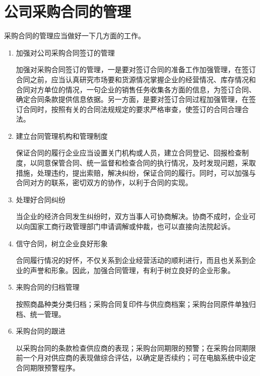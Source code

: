 \section {公司采购合同的管理}

    采购合同的管理应当做好一下几方面的工作。

    \begin{enumerate}
        \item 加强对公司采购合同签订的管理

        加强对采购合同签订的管理，一是要对签订合同的准备工作加强管理，在签订合同之前，应当认真研究市场要和货源情况掌握企业的经营情况、库存情况和合同对方单位的情况，一句企业的销售任务收集各方面的信息，为签订合同、确定合同条款提供信息依据。另一方面，是要对签订合同过程加强管理，在签订合同时，按照有关的合同法规规定的要求严格审查，使签订的合同合理合法。

        \item 建立台同管理机构和管理制度

        保证合同的履行企业应当设置关门机构或人员，建立合同登记、回报检查制度，以同意保管合同、统一监督和检查合同的执行情况，及时发现问题，采取措施，处理违约，提出索赔，解决纠纷，保证合同的履行。同时，可以加强与合同对方的联系，密切双方的协作，以利于合同的实现。

        \item 处理好合同纠纷

        当企业的经济合同发生纠纷时，双方当事人可协商解决。协商不成时，企业可以向国家工商行政管理部门申请调解或仲裁，也可以直接向法院起诉。

        \item 信守合同，树立企业良好形象

        合同履行情况的好怀，不仅关系到企业经营活动的顺利进行，而且也关系到企业的声誉和形象。因此，加强合同管理，有利于树立良好的企业形象。

        \item 来购合同的归档管理

        按照商晶种类分类归档；采购合同复印件与供应商档案；采购台同原件单独归档、统一管理。

        \item 采购台同的跟进

        以采购台同的条款检查供应商的表现；采购台同期限的预警；在采购台同期限前一个月对供应商的表现做综合评估，以确定是否续约；可在电脑系统中设定合同期限预警程序。

    \end{enumerate}

